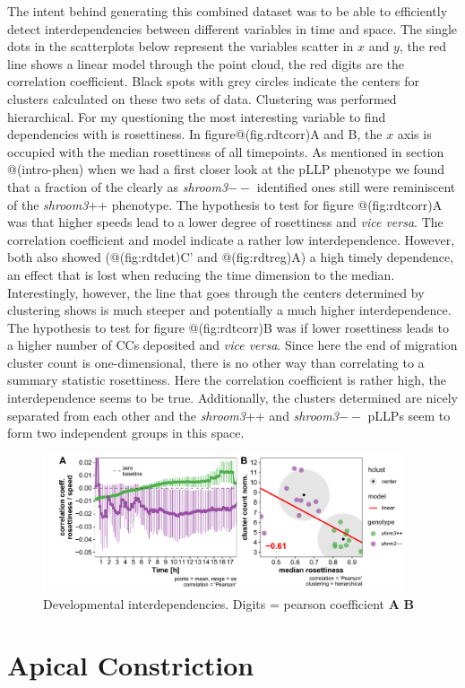 \documentclass[11pt,singlespacinge,twoside]{reedthesis} %
\begin{document}
The intent behind generating this combined dataset was to be able to efficiently detect interdependencies between different variables in time and space. The single dots in the scatterplots below represent the variables scatter in \(x\) and \(y\), the red line shows a linear model through the point cloud, the red digits are the correlation coefficient. Black spots with grey circles indicate the centers for clusters calculated on these two sets of data. Clustering was performed hierarchical.
For my questioning the most interesting variable to find dependencies with is rosettiness. In figure@(fig.rdtcorr)A and B, the \(x\) axis is occupied with the median rosettiness of all timepoints. As mentioned in section @(intro-phen) when we had a first closer look at the pLLP phenotype we found that a fraction of the clearly as \emph{shroom3}\(--\) identified ones still were reminiscent of the \emph{shroom3}++ phenotype. The hypothesis to test for figure @(fig:rdtcorr)A was that higher speeds lead to a lower degree of rosettiness and \emph{vice versa}. The correlation coefficient and model indicate a rather low interdependence. However, both also showed (@(fig:rdtdet)C' and @(fig:rdtreg)A) a high timely dependence, an effect that is lost when reducing the time dimension to the median. Interestingly, however, the line that goes through the centers determined by clustering shows is much steeper and potentially a much higher interdependence.
The hypothesis to test for figure @(fig:rdtcorr)B was if lower rosettiness leads to a higher number of CCs deposited and \emph{vice versa}. Since here the end of migration cluster count is one-dimensional, there is no other way than correlating to a summary statistic rosettiness. Here the correlation coefficient is rather high, the interdependence seems to be true. Additionally, the clusters determined are nicely separated from each other and the \emph{shroom3}++ and \emph{shroom3}\(--\) pLLPs seem to form two independent groups in this space.


\begin{figure}

{\centering \includegraphics[width=0.95\textwidth]{figures/results/03_rosettes/rdt_corr_speed-ros} 

}

\caption[Developmental interdependencies]{Developmental interdependencies. Digits = pearson coefficient \textbf{A} \textbf{B}}\label{fig:rdtcorr}
\end{figure}
\hypertarget{apical-constriction-1}{%
\section{Apical Constriction}\label{apical-constriction-1}}
\end{document}
